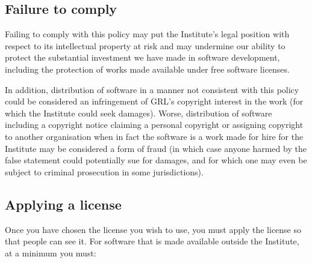 \documentclass[10pt,a4paper]{article}
\begin{document}
\subsection{Failure to comply}
\label{section:policy.copyright.failure}
\par Failing to comply with this policy may put the Institute's legal position with respect 
to its intellectual property at risk and may undermine our ability to protect the 
substantial investment we have made in software development, including the protection 
of works made available under free software licenses. 

\par In addition, distribution of software in a manner not consistent with this policy could be 
considered an infringement of GRL's copyright interest in the work (for which the 
Institute could seek damages). Worse, distribution of software including a copyright 
notice claiming a personal copyright or assigning copyright to another 
organisation when in fact the software is a work made for hire for the Institute may 
be considered a form of fraud (in which case anyone harmed by the false 
statement could potentially sue for damages, and for which one may even be subject 
to criminal prosecution in some jurisdictions). 


%





\subsection{Applying a license}

Once you have chosen the license you wish to use, you must apply the license so that 
people can see it. For software that is made available outside the Institute, at a 
minimum you must:
\end{document}
